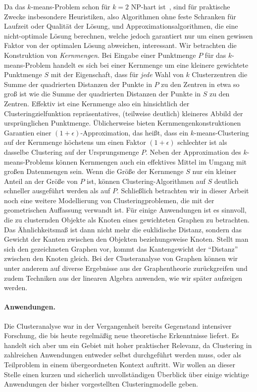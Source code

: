 Da das $k$-means-Problem schon für $k = 2$ NP-hart ist~\cite{AloiseDHP09}, sind für praktische Zwecke insbesondere
Heuristiken, also Algorithmen ohne feste Schranken für Laufzeit oder Qualität der Lösung, und
Approximationsalgorithmen, die eine nicht-optimale Lösung berechnen, welche jedoch garantiert nur um einen gewissen
Faktor von der optimalen Lösung abweichen, interessant. Wir betrachten die Konstruktion von \emph{Kernmengen}.
Bei Eingabe einer Punktmenge $P$ für das $k$-means-Problem handelt es sich bei einer Kernmenge um eine kleinere gewichtete
Punktmenge $S$ mit der Eigenschaft, dass für \emph{jede} Wahl von $k$ Clusterzentren die Summe der quadrierten Distanzen der Punkte in
$P$ zu den Zentren in etwa so groß ist wie die Summe der quadrierten Distanzen der Punkte in $S$ zu den Zentren. Effektiv ist
eine Kernmenge also ein hinsichtlich der Clusteringzielfunktion repräsentatives, (teilweise deutlich) kleineres Abbild der
ursprünglichen Punktmenge. Üblicherweise bieten Kernmengenkonstruktionen Garantien einer $(1 + \epsilon)$-Approximation,
das heißt, dass ein $k$-means-Clustering auf der Kernmenge höchstens um einen Faktor $(1 + \epsilon)$ schlechter ist als dasselbe
Clustering auf der Ursprungsmenge $P$. Neben der Approximation des $k$-means-Problems können Kernmengen auch ein
effektives Mittel im Umgang mit großen Datenmengen sein. Wenn die Größe der Kernmenge $S$ nur ein kleiner Anteil an der Größe
von $P$ ist, können Clustering-Algorithmen auf $S$ deutlich schneller ausgeführt werden als auf $P$.
\absatz
Schließlich betrachten wir in dieser Arbeit noch eine weitere Modellierung von Clusteringproblemen, die mit der geometrischen
Auffassung verwandt ist. Für einige Anwendungen ist es sinnvoll, die zu clusternden Objekte als Knoten eines gewichteten
Graphen zu betrachten. Das Ähnlichkeitsmaß ist dann nicht mehr die euklidische Distanz, sondern das Gewicht der Kanten zwischen
den Objekten beziehungsweise Knoten. Stellt man sich den gezeichneten Graphen vor, kommt das Kantengewicht der "`Distanz"'
zwischen den Knoten gleich. Bei der Clusteranalyse von Graphen können wir unter anderem auf diverse Ergebnisse aus der
Graphentheorie zurückgreifen und zudem Techniken aus der linearen Algebra anwenden, wie wir später aufzeigen werden.

\paragraph{Anwendungen.} Die Clusteranalyse war in der Vergangenheit bereits Gegenstand intensiver Forschung, die bis heute
regelmäßig neue theoretische Erkenntnisse liefert. Es handelt sich aber um ein Gebiet mit hoher praktischer Relevanz, da
Clustering in zahlreichen Anwendungen entweder selbst durchgeführt werden muss, oder als Teilproblem in einem übergeordneten
Kontext auftritt.
Wir wollen an dieser Stelle einen kurzen und sicherlich unvollständigen Überblick über einige wichtige Anwendungen
der bisher vorgestellten Clusteringmodelle geben.


